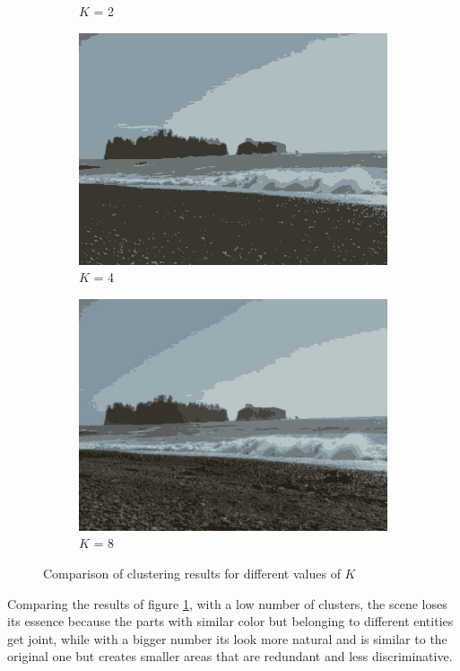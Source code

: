 \begin{figure}[!h]
\begin{subfigure}{0.5\textwidth}
	  \caption{$K$ = 2}
	\end{subfigure}
	\begin{subfigure}{0.5\textwidth}
        \centering
        \includegraphics[width=0.9\linewidth]{figs/beach_1_clustK4.jpg}
        \caption{$K$ = 4}
    \end{subfigure}%
    \begin{subfigure}{0.5\textwidth}
	  \centering
	  \includegraphics[width=0.9\linewidth]{figs/beach_1_clustK8.jpg}
	\caption{$K$ = 8}
	\end{subfigure}
	
    \caption{Comparison of clustering results for different values of $K$}
	\label{fig:clusters}
\end{figure}

Comparing the results of figure \ref{fig:clusters}, with a low number of clusters, the scene loses its essence because the parts with similar color but belonging to different entities get joint, while with a bigger number its look more natural and is similar to the original one but creates smaller areas that are redundant and less discriminative.

